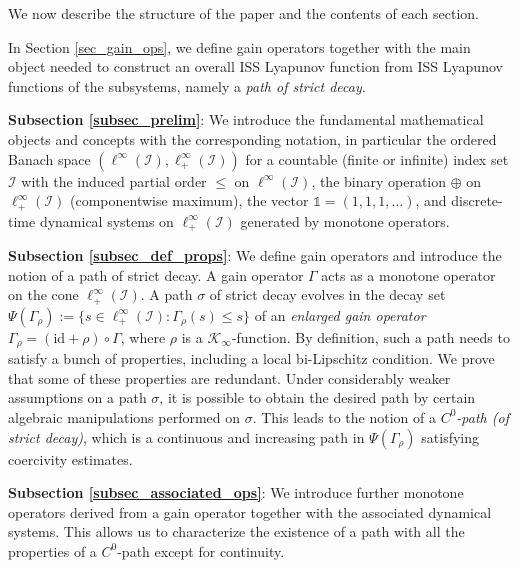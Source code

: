 \documentclass[10pt, oneside, a4paper]{article}
\newcommand{\unit}{\mathds{1}}
\newcommand{\id}{\mathrm{id}}
\newcommand{\IC}{\mathcal{I}}
\newcommand{\KC}{\mathcal{K}}
\begin{document}
We now describe the structure of the paper and the contents of each section.%

In Section \ref{sec_gain_ops}, we define gain operators together with the main object needed to construct an overall ISS Lyapunov function from ISS Lyapunov functions of the subsystems, namely a \emph{path of strict decay}.%

{\bf Subsection \ref{subsec_prelim}}: We introduce the fundamental mathematical objects and concepts with the corresponding notation, in particular the ordered Banach space $(\ell^{\infty}(\IC),\ell^{\infty}_+(\IC))$ for a countable (finite or infinite) index set $\IC$ with the induced partial order $\leq$ on $\ell^{\infty}(\IC)$, the binary operation $\oplus$ on $\ell^{\infty}_+(\IC)$ (componentwise maximum), the vector $\unit = (1,1,1,\ldots)$, and discrete-time dynamical systems on $\ell^{\infty}_+(\IC)$ generated by monotone operators.%

{\bf Subsection \ref{subsec_def_props}}: We define gain operators and introduce the notion of a path of strict decay. A gain operator $\Gamma$ acts as a monotone operator on the cone $\ell^{\infty}_+(\IC)$. A path $\sigma$ of strict decay evolves in the decay set $\Psi(\Gamma_{\rho}) := \{ s \in \ell^{\infty}_+(\IC) : \Gamma_{\rho}(s) \leq s \}$ of an \emph{enlarged gain operator} $\Gamma_{\rho} = (\id + \rho) \circ \Gamma$, where $\rho$ is a $\KC_{\infty}$-function. By definition, such a path needs to satisfy a bunch of properties, including a local bi-Lipschitz condition. We prove that some of these properties are redundant. Under considerably weaker assumptions on a path $\sigma$, it is possible to obtain the desired path by certain algebraic manipulations performed on $\sigma$. This leads to the notion of a \emph{$C^0$-path (of strict decay)}, which is a continuous and increasing path in $\Psi(\Gamma_{\rho})$ satisfying coercivity estimates.%

{\bf Subsection \ref{subsec_associated_ops}}: We introduce further monotone operators derived from a gain operator together with the associated dynamical systems. This allows us to characterize the existence of a path with all the properties of a $C^0$-path except for continuity.%
\end{document}
